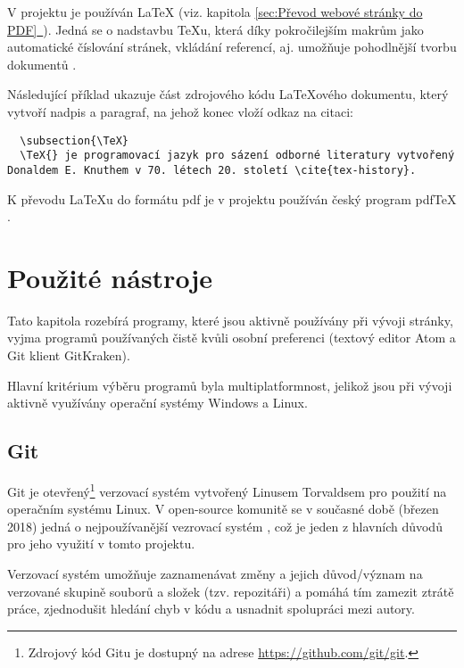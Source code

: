 \documentclass[a4paper, 12pt]{article}
\newcommand*{\fullref}[1]{\hyperref[{#1}]{\ref*{#1}~\nameref*{#1}}}
\begin{document}
  V projektu je používán \LaTeX{} (viz. kapitola \fullref{sec:Převod webové stránky do PDF}). Jedná se o nadstavbu \TeX u, která díky pokročilejším makrům jako automatické číslování stránek, vkládání referencí, aj. umožňuje pohodlnější tvorbu dokumentů \cite{getting-started-with-latex}.

  Následující příklad ukazuje část zdrojového kódu \LaTeX ového dokumentu, který vytvoří nadpis a paragraf, na jehož konec vloží odkaz na citaci:

  \begin{verbatim}
  \subsection{\TeX}
  \TeX{} je programovací jazyk pro sázení odborné literatury vytvořený Donaldem E. Knuthem v 70. létech 20. století \cite{tex-history}.
  \end{verbatim}

  K převodu \LaTeX u do formátu \gls{pdf} je v projektu používán český program pdf\TeX{} \cite{pdftex}. %


  \section{Použité nástroje} \label{sec:Použité nástroje}
  Tato kapitola rozebírá programy, které jsou aktivně používány při vývoji stránky, vyjma programů používaných čistě kvůli osobní preferenci (textový editor Atom a Git klient GitKraken).

  Hlavní kritérium výběru programů byla multiplatformnost, jelikož jsou při vývoji aktivně využívány operační systémy Windows a Linux.


  \subsection{Git} \label{sec:Git}
  Git je otevřený\footnote{Zdrojový kód Gitu je dostupný na adrese \url{https://github.com/git/git}.} verzovací systém vytvořený Linusem Torvaldsem pro použití na operačním systému Linux. V open-source komunitě se v současné době (březen 2018) jedná o nejpoužívanější vezrovací systém \cite{version-control-usage-statistics}, což je jeden z hlavních důvodů pro jeho využití v tomto projektu.

  Verzovací systém umožňuje zaznamenávat změny a jejich důvod/význam na verzované skupině souborů a složek (tzv. repozitáři) a pomáhá tím zamezit ztrátě práce, zjednodušit hledání chyb v kódu a usnadnit spolupráci mezi autory.
\end{document}
